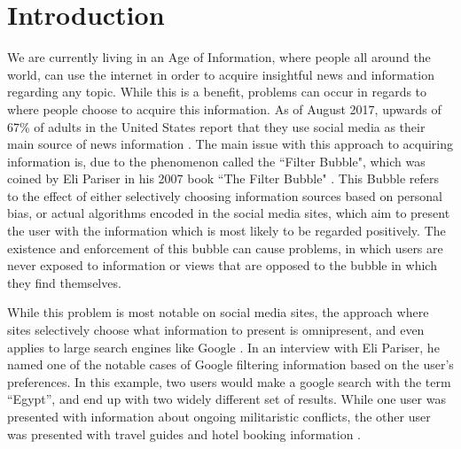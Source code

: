 \chapter{Introduction}
We are currently living in an Age of Information, where people all around the
world, can use the internet in order to acquire insightful news and information
regarding any topic. While this is a benefit, problems can occur in regards to
where people choose to acquire this information. As of August 2017, upwards of
67\% of adults in the United States report that they use social media as their
main source of news information \citep{journalism2017}. The main issue with this
approach to acquiring information is, due to the phenomenon called the ``Filter
Bubble", which was coined by Eli Pariser in his 2007 book ``The Filter
Bubble" \citep{pariser2011filter}. This Bubble refers to the effect of either
selectively choosing information sources based on personal bias, or actual
algorithms encoded in the social media sites, which aim to present the user with
the information which is most likely to be regarded positively. The existence
and enforcement of this bubble can cause problems, in which users are never
exposed to information or views that are opposed to the bubble in which they
find themselves.

While this problem is most notable on social media sites, the approach where
sites selectively choose what information to present is omnipresent, and even
applies to large search engines like Google \citep{filterBubbleDef}. In an
interview with Eli Pariser, he named one of the notable cases of Google
filtering information based on the user's preferences. In this example, two
users would make a google search with the term ``Egypt'', and end up with two
widely different set of results. While one user was presented with information
about ongoing militaristic conflicts, the other user was presented with travel
guides and hotel booking information \citep{nusSduSearch}.
